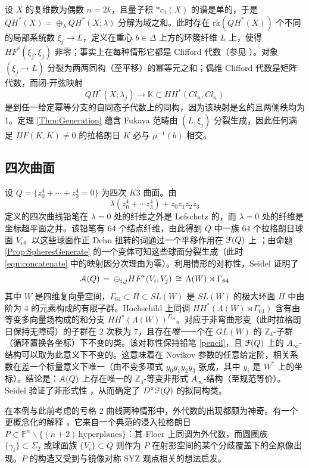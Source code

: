 \documentclass[11pt,a4paper]{article}
\numberwithin{equation}{section}
\newcommand{\bZ}{\mathbb{Z}}
\newcommand{\bP}{\mathbb{P}}
\newcommand{\bK}{\mathbb{K}}
\newcommand{\scrA}{\EuScript{A}}
\newcommand{\scrF}{\EuScript{F}}
\begin{document}
设 $X$ 的复维数为偶数 $n=2k$，且量子积 $\ast c_1(X)$ 的谱是单的，于是 $QH^*(X) = \oplus_{\lambda} QH^*(X;\lambda)$ 分解为域之和。此时存在 $\mathrm{rk}(QH^*(X))$ 个不同的局部系统数 $\xi_j \rightarrow L$，定义在重心 $b\in\Delta$ 上方的环簇纤维 $L$ 上，使得 $HF^*(\xi_j, \xi_j)$ 非零；事实上在每种情形它都是 Clifford 代数（参见 \cite{Cho-Oh, FO3:toric, RitterSmith}）。对象 $(\xi_j \rightarrow L)$ 分裂为两两同构（至平移）的幂等元之和；偶维 Clifford 代数是矩阵代数，而闭-开弦映射
\[
QH^*(X;\lambda_j) \longrightarrow \bK \subset HH^*(Cl_n, Cl_n) 
\]
是到任一给定幂等分支的自同态子代数上的同构，因为该映射是幺的且两侧秩均为 1。定理 \ref{Thm:Generation} 蕴含 Fukaya 范畴由 $(L,\xi_j)$ 分裂生成，因此任何满足 $HF(K,K)\neq 0$ 的拉格朗日 $K$ 必与 $\mu^{-1}(b)$ 相交。

\subsection{四次曲面\label{Sec:K3}} 设 $Q= \{z_0^4+\cdots + z_3^4 = 0\}$ 为四次 $K3$ 曲面。由
\begin{equation}\label{pencil}
\lambda(z_0^4+ \cdots z_3^4) + z_0z_1z_2z_3
\end{equation}
定义的四次曲线铅笔在 $\lambda = 0$ 处的纤维之外是 Lefschetz 的，而 $\lambda = 0$ 处的纤维是坐标超平面之并。该铅笔有 $64$ 个结点纤维，由此得到 $Q$ 中一族 $64$ 个拉格朗日球面 $V_i$。以这些球面作正 Dehn 扭转的词通过一个平移作用在 $\scrF(Q)$ 上 \cite{Seidel:HMSquartic}；由命题 \ref{Prop:SpheresGenerate} 的一个变体可知这些球面分裂生成（此时 \eqref{eqn:concatenate} 中的映射因分次理由为零）。利用情形的对称性，Seidel 证明了
\[
\scrA(Q) \, = \, \oplus_{i,j} HF^*(V_i, V_j) \, \cong \, \Lambda(W) \rtimes \Gamma_{64}
\]
其中 $W$ 是四维复向量空间，$\Gamma_{64} \subset H \subset SL(W)$ 是 $SL(W)$ 的极大环面 $H$ 中由阶为 $4$ 的元素构成的有限子群。Hochschild 上同调 $HH^*(\Lambda(W)\rtimes \Gamma_{64})$ 含有由等变多向量场构成的和分支 $HH^*(\Lambda(W))^{\Gamma_{64}}$。对应于非弯曲形变（此时拉格朗日保持无障碍）的子群在 $2$ 次秩为 $7$，且存在\emph{唯一}一个在 $GL(W)$ 的 $\bZ_4$-子群（循环置换各坐标）下不变的类。该对称性保持铅笔 \eqref{pencil}，且 $\scrF(Q)$ 上的 $A_{\infty}$-结构可以取为此意义下不变的。这意味着在 Novikov 参数的任意给定阶，相关系数在差一个标量意义下唯一（由不变多项式 $y_0y_1y_2y_3$ 张成，其中 $y_i$ 是 $W^*$ 上的坐标）。结论是：$\scrA(Q)$ 上存在唯一的 $\bZ_4$-等变非形式 $A_{\infty}$-结构（至规范等价）。Seidel 验证了非形式性 \cite{Seidel:HMSquartic}，从而确定了 $D^{\pi}\scrF(Q)$ 的拟同构类。

在本例与此前考虑的亏格 2 曲线两种情形中，外代数的出现都颇为神奇。有一个更概念化的解释 \cite{Seidel:HMSgenus2, Sheridan}，它来自一个典范的浸入拉格朗日 $P \subset \bP^n\backslash \{(n+2) \, \mathrm{hyperplanes}\}$：其 Floer 上同调为外代数，而圆圈族 $\{\gamma_i\} \subset \Sigma_2$ 或球面族 $\{V_i\} \subset Q$ 则作为 $P$ 在射影空间的某个分歧覆盖下的全原像出现。$P$ 的构造又受到与镜像对称 SYZ 观点相关的想法启发。
\end{document}
